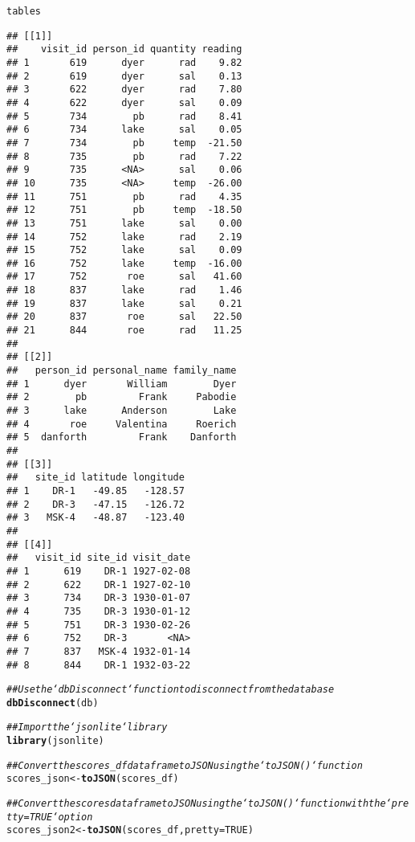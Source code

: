 \documentclass{article}\usepackage[]{graphicx}\usepackage[]{xcolor}
\makeatletter
\newcommand{\hlnum}[1]{\textcolor[rgb]{0.686,0.059,0.569}{#1}}%
\newcommand{\hlcom}[1]{\textcolor[rgb]{0.678,0.584,0.686}{\textit{#1}}}%
\newcommand{\hlstd}[1]{\textcolor[rgb]{0.345,0.345,0.345}{#1}}%
\newcommand{\hlkwb}[1]{\textcolor[rgb]{0.69,0.353,0.396}{#1}}%
\newcommand{\hlkwc}[1]{\textcolor[rgb]{0.333,0.667,0.333}{#1}}%
\newcommand{\hlkwd}[1]{\textcolor[rgb]{0.737,0.353,0.396}{\textbf{#1}}}%
\newenvironment{kframe}{%
 \def\at@end@of@kframe{}%
 \ifinner\ifhmode%
  \def\at@end@of@kframe{\end{minipage}}%
  \begin{minipage}{\columnwidth}%
 \fi\fi%
 \def\FrameCommand##1{\hskip\@totalleftmargin \hskip-\fboxsep
 \colorbox{shadecolor}{##1}\hskip-\fboxsep
     \hskip-\linewidth \hskip-\@totalleftmargin \hskip\columnwidth}%
 \MakeFramed {\advance\hsize-\width
   \@totalleftmargin\z@ \linewidth\hsize
   \@setminipage}}%
 {\par\unskip\endMakeFramed%
 \at@end@of@kframe}
\newenvironment{knitrout}{}{} %
\makeatother
\begin{document}
\begin{knitrout}
\begin{kframe}
{\ttfamily\noindent\color{warningcolor}{\#\# Warning: Column `reading`: mixed type, first seen values of type real, coercing other values of type string}}\begin{alltt}
\hlstd{tables}
\end{alltt}
\begin{verbatim}
## [[1]]
##    visit_id person_id quantity reading
## 1       619      dyer      rad    9.82
## 2       619      dyer      sal    0.13
## 3       622      dyer      rad    7.80
## 4       622      dyer      sal    0.09
## 5       734        pb      rad    8.41
## 6       734      lake      sal    0.05
## 7       734        pb     temp  -21.50
## 8       735        pb      rad    7.22
## 9       735      <NA>      sal    0.06
## 10      735      <NA>     temp  -26.00
## 11      751        pb      rad    4.35
## 12      751        pb     temp  -18.50
## 13      751      lake      sal    0.00
## 14      752      lake      rad    2.19
## 15      752      lake      sal    0.09
## 16      752      lake     temp  -16.00
## 17      752       roe      sal   41.60
## 18      837      lake      rad    1.46
## 19      837      lake      sal    0.21
## 20      837       roe      sal   22.50
## 21      844       roe      rad   11.25
## 
## [[2]]
##   person_id personal_name family_name
## 1      dyer       William        Dyer
## 2        pb         Frank     Pabodie
## 3      lake      Anderson        Lake
## 4       roe     Valentina     Roerich
## 5  danforth         Frank    Danforth
## 
## [[3]]
##   site_id latitude longitude
## 1    DR-1   -49.85   -128.57
## 2    DR-3   -47.15   -126.72
## 3   MSK-4   -48.87   -123.40
## 
## [[4]]
##   visit_id site_id visit_date
## 1      619    DR-1 1927-02-08
## 2      622    DR-1 1927-02-10
## 3      734    DR-3 1930-01-07
## 4      735    DR-3 1930-01-12
## 5      751    DR-3 1930-02-26
## 6      752    DR-3       <NA>
## 7      837   MSK-4 1932-01-14
## 8      844    DR-1 1932-03-22
\end{verbatim}
\begin{alltt}
\hlcom{## Use the `dbDisconnect` function to disconnect from the database}
\hlkwd{dbDisconnect}\hlstd{(db)}

\hlcom{## Import the `jsonlite` library}
\hlkwd{library}\hlstd{(jsonlite)}

\hlcom{## Convert the scores_df dataframe to JSON using the `toJSON()` function}
\hlstd{scores_json} \hlkwb{<-} \hlkwd{toJSON}\hlstd{(scores_df)}

\hlcom{## Convert the scores dataframe to JSON using the `toJSON()` function with the `pretty=TRUE` option}
\hlstd{scores_json2} \hlkwb{<-} \hlkwd{toJSON}\hlstd{(scores_df,}\hlkwc{pretty}\hlstd{=}\hlnum{TRUE}\hlstd{)}
\end{alltt}
\end{kframe}
\end{knitrout}
\end{document}
